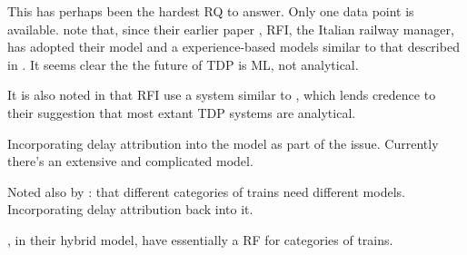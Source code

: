 \documentclass{article}
\begin{document}
This has perhaps been the hardest RQ to answer. Only one data point is available. \cite{oneto_et_al_2019} note that, since their earlier paper \cite{oneto_et_al_2016}, RFI, the Italian railway manager, has adopted their model and a experience-based models similar to that described in \cite{hansen_goverde_van_der_meer_2010}. It seems clear the the future of TDP is ML, not analytical.

It is also noted in \cite{oneto_et_al_2016} that RFI use a system similar to \cite{hansen_goverde_van_der_meer_2010}, which lends credence to their suggestion that most extant TDP systems are analytical.

Incorporating delay attribution into the model as part of the issue. Currently there's an extensive and complicated model. 

Noted also by \cite{nair_et_al_2019}: that different categories of trains need different models. 
Incorporating delay attribution back into it. 



\cite{oneto_et_al_2019}, in their hybrid model, have essentially a RF for categories of trains.








\end{document}
